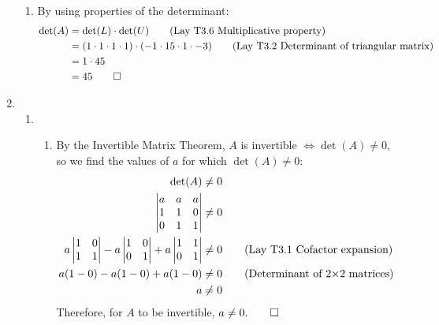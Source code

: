 \documentclass[12pt, a4paper]{article}
\begin{document}
\begin{enumerate}[Q\arabic*.]
\begin{enumerate}[(\alph*)]
      \item By using properties of the determinant:
        \begin{align*}
          \det(A) &= \det(L) \cdot \det(U)\tag*{(Lay T3.6 Multiplicative property)}\\
                  &= (1 \cdot 1 \cdot 1 \cdot 1) \cdot (-1 \cdot 15 \cdot 1 \cdot -3)\tag*{(Lay T3.2 Determinant of triangular matrix)}\\
                  &= 1 \cdot 45\\
                  &= 45 \qed
        \end{align*}
    \end{enumerate}
    \pagebreak

  \item \begin{enumerate}[(\alph*)]
      \item \begin{enumerate}[(\roman*)]
          \item By the Invertible Matrix Theorem, $A$ is invertible $\iff \det(A) \neq 0$, so we find the values of $a$ for which $\det(A) \neq 0$:
            \begin{align*}
              \det(A) &\neq 0\\
              \begin{vmatrix}
                a&a&a\\
                1&1&0\\
                0&1&1
              \end{vmatrix} &\neq 0\\
              a \begin{vmatrix}1&0\\1&1\end{vmatrix} -  a \begin{vmatrix}1&0\\0&1\end{vmatrix} +  a \begin{vmatrix}1&1\\0&1\end{vmatrix} &\neq 0\tag*{\text{(Lay T3.1 Cofactor expansion)}}\\
              a(1-0) - a(1-0) + a(1-0) &\neq 0\tag*{\text{(Determinant of 2$\times$2 matrices)}}\\
              a &\neq 0
            \end{align*}
            Therefore, for $A$ to be invertible, $a \neq 0. \qed$


\end{enumerate}
\end{enumerate}
\end{enumerate}
\end{document}
